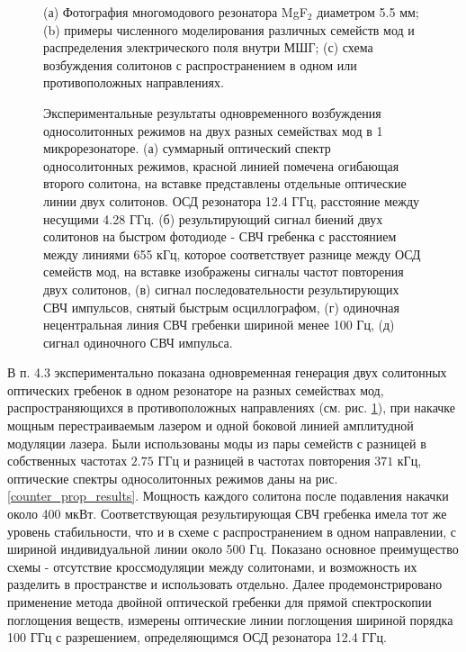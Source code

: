 \begin{figure}[!htb]
\begin{minipage}{1\linewidth}
\end{minipage}
\setlength{\belowcaptionskip}{4pt}
\caption{(а) Фотография многомодового резонатора MgF$_2$ диаметром 5.5 мм; (b) примеры численного моделирования различных семейств мод и распределения электрического поля внутри МШГ; (с) схема возбуждения солитонов с распространением в одном или противоположных направлениях.}
\label{Figure1_V1_c}
\end{figure}

\begin{figure}[!htb]
\begin{minipage}{1\linewidth}
\end{minipage}
\setlength{\belowcaptionskip}{4pt}
\caption{Экспериментальные результаты одновременного возбуждения односолитонных режимов на двух разных семействах мод в 1 микрорезонаторе. (а) суммарный оптический спектр односолитонных режимов, красной линией помечена огибающая второго солитона, на вставке представлены отдельные оптические линии двух солитонов. ОСД резонатора 12.4 ГГц, расстояние между несущими 4.28 ГГц. (б) результирующий сигнал биений двух солитонов на быстром фотодиоде - СВЧ гребенка с расстоянием между линиями 655 кГц, которое соответствует разнице между ОСД семейств мод, на вставке изображены сигналы частот повторения двух солитонов, (в) сигнал последовательности результирующих СВЧ импульсов, снятый быстрым осциллографом, (г) одиночная нецентральная линия СВЧ гребенки шириной менее 100 Гц, (д) сигнал одиночного СВЧ импульса.}
\label{Co_Scheme_results}
\end{figure}

В п. 4.3 экспериментально показана одновременная генерация двух солитонных оптических гребенок в одном резонаторе на разных семействах мод, распространяющихся в противоположных направлениях (см. рис. \ref{Figure1_V1_c}), при накачке мощным перестраиваемым лазером и одной боковой линией амплитудной модуляции лазера. Были использованы моды из пары семейств с разницей в собственных частотах $2.75$ ГГц и разницей в частотах повторения $371$ кГц, оптические спектры односолитонных режимов даны на рис. \ref{counter_prop_results}. Мощность каждого солитона после подавления накачки около 400 мкВт. Соответствующая результирующая СВЧ гребенка имела тот же уровень стабильности, что и в схеме с распространением в одном направлении, с шириной индивидуальной линии около 500 Гц. Показано основное преимущество схемы - отсутствие кроссмодуляции между солитонами, и возможность их разделить в пространстве и использовать отдельно. Далее продемонстрировано применение метода двойной оптической гребенки для прямой спектроскопии поглощения веществ, измерены оптические линии поглощения шириной порядка 100 ГГц с разрешением, определяющимся ОСД резонатора 12.4 ГГц.

